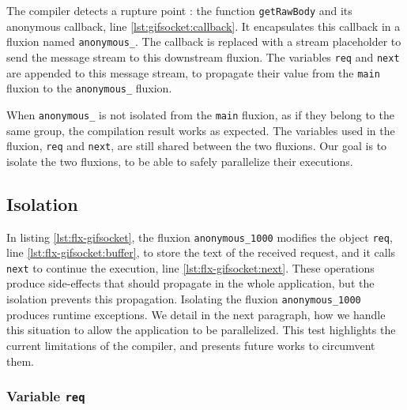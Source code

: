 The compiler detects a rupture point : the function \texttt{get\-Raw\-Body} and its anonymous callback, line \ref{lst:gifsocket:callback}.
It encapsulates this callback in a fluxion named \texttt{anonymous\_}.
The callback is replaced with a stream placeholder to send the message stream to this downstream fluxion.
The variables \texttt{req} and \texttt{next} are appended to this message stream, to propagate their value from the \texttt{main} fluxion to the \texttt{anonymous\_} fluxion.


When \texttt{anonymous\_} is not isolated from the \texttt{main} fluxion, as if they belong to the same group, the compilation result works as expected.
The variables used in the fluxion, \texttt{req} and \texttt{next}, are still shared between the two fluxions.
Our goal is to isolate the two fluxions, to be able to safely parallelize their executions.

\subsection{Isolation}

\vspace{-\baselineskip}

In listing \ref{lst:flx-gifsocket}, the fluxion \texttt{anonymous\_1000} modifies the object \texttt{req}, line \ref{lst:flx-gifsocket:buffer}, to store the text of the received request, and it calls \texttt{next} to continue the execution, line \ref{lst:flx-gifsocket:next}.
These operations produce side-effects that should propagate in the whole application, but the isolation prevents this propagation.
Isolating the fluxion \texttt{anonymous\_1000} produces runtime exceptions.
We detail in the next paragraph, how we handle this situation to allow the application to be parallelized.
This test highlights the current limitations of the compiler, and presents future works to circumvent them.

\subsubsection{Variable \texttt{req}}

